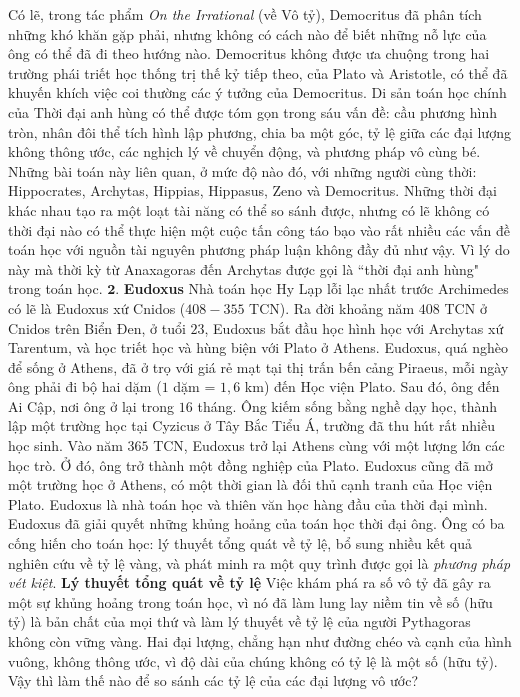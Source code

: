 \begin{multicols}{2}
	\vskip 0.1cm
	Có lẽ, trong tác phẩm \textit{On the Irrational} (về Vô tỷ), Democritus đã phân tích những khó khăn gặp phải, nhưng không có cách nào để biết những nỗ lực của ông có thể đã đi theo hướng nào.
	\vskip 0.1cm
	Democritus không được ưa chuộng trong hai trường phái triết học thống trị thế kỷ tiếp theo, của Plato và Aristotle, có thể đã khuyến khích việc coi thường các ý tưởng của Democritus. 
	\vskip 0.1cm
	Di sản toán học chính của Thời đại anh hùng có thể được tóm gọn trong sáu vấn đề: cầu phương hình tròn, nhân đôi thể tích hình lập phương, chia ba một góc, tỷ lệ giữa các đại lượng không thông ước, các nghịch lý về chuyển động, và phương pháp vô cùng bé. 
	\vskip 0.1cm
	Những bài toán này liên quan, ở mức độ nào đó, với những người cùng thời: Hippocrates, Archytas, Hippias, Hippasus, Zeno và Democritus. 
	\vskip 0.1cm
	Những thời đại khác nhau tạo ra một loạt tài năng có thể so sánh được, nhưng có lẽ không có thời đại nào có thể thực hiện một cuộc tấn công táo bạo vào rất nhiều các vấn đề toán học với nguồn tài nguyên phương pháp luận không đầy đủ như vậy. Vì lý do này mà thời kỳ từ Anaxagoras đến Archytas được gọi là ``thời đại anh hùng" trong toán học.
	\vskip 0.1cm
	$\pmb{2.}$ \textbf{\color{lichsutoanhoc}Eudoxus}
	\vskip 0.1cm
	 Nhà toán học Hy Lạp lỗi lạc nhất trước Archimedes có lẽ là Eudoxus xứ Cnidos ($408 - 355$ TCN).
	 \vskip 0.1cm
	Ra đời khoảng năm $408$ TCN ở Cnidos trên Biển Đen, ở tuổi $23$, Eudoxus bắt đầu học hình học với Archytas xứ Tarentum, và học triết học và hùng biện với Plato ở Athens. Eudoxus, quá nghèo để sống ở Athens, đã ở trọ với giá rẻ mạt tại thị trấn bến cảng Piraeus, mỗi ngày ông phải đi bộ hai dặm ($1$ dặm = $1{,}6$ km) đến Học viện Plato. Sau đó, ông đến Ai Cập, nơi ông ở lại trong $16$ tháng. Ông kiếm sống bằng nghề dạy học, thành lập một trường học tại Cyzicus ở Tây Bắc Tiểu Á, trường đã thu hút rất nhiều học sinh. Vào năm $365$ TCN, Eudoxus trở lại Athens cùng với một lượng lớn các học trò. Ở đó, ông trở thành một đồng nghiệp của Plato.
	Eudoxus cũng đã mở một trường học ở Athens, có một thời gian là đối thủ cạnh tranh của Học viện Plato.
	\vskip 0.1cm
	Eudoxus là nhà toán học và thiên văn học hàng đầu của thời đại mình. Eudoxus đã giải quyết những khủng hoảng của toán học thời đại ông. Ông có ba cống hiến cho toán học: lý thuyết tổng quát về tỷ lệ, bổ sung nhiều kết quả nghiên cứu về tỷ lệ vàng, và phát minh ra một quy trình được gọi là \textit{phương pháp vét kiệt}.
	\vskip 0.1cm 
	\textbf{\color{lichsutoanhoc}Lý thuyết tổng quát về tỷ lệ} 
	\vskip 0.1cm
	Việc khám phá ra số vô tỷ đã gây ra một sự khủng hoảng trong toán học, vì nó đã làm lung lay niềm tin về số (hữu tỷ) là bản chất của mọi thứ và làm lý thuyết về tỷ lệ của người Pythagoras không còn vững vàng. Hai đại lượng, chẳng hạn như đường chéo và cạnh của hình vuông, không thông ước, vì độ dài của chúng không có tỷ lệ là một số (hữu tỷ). Vậy thì làm thế nào để so sánh các tỷ lệ của các đại lượng vô ước?

\end{multicols}
